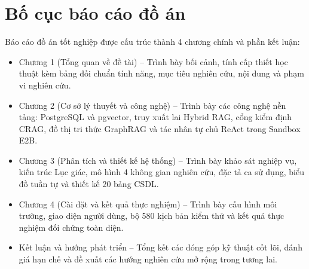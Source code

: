 \section{Bố cục báo cáo đồ án}
\label{sec:bo_cuc}
Báo cáo đồ án tốt nghiệp được cấu trúc thành 4 chương chính và phần kết luận:
\begin{itemize}
    \item Chương 1 (Tổng quan về đề tài) -- Trình bày bối cảnh, tính cấp thiết học thuật kèm bảng đối chuẩn tính năng, mục tiêu nghiên cứu, nội dung và phạm vi nghiên cứu.
    \item Chương 2 (Cơ sở lý thuyết và công nghệ) -- Trình bày các công nghệ nền tảng: PostgreSQL và pgvector, truy xuất lai Hybrid RAG, cổng kiểm định CRAG, đồ thị tri thức GraphRAG và tác nhân tự chủ ReAct trong Sandbox E2B.
    \item Chương 3 (Phân tích và thiết kế hệ thống) -- Trình bày khảo sát nghiệp vụ, kiến trúc Lục giác, mô hình 4 không gian nghiên cứu, đặc tả ca sử dụng, biểu đồ tuần tự và thiết kế 20 bảng CSDL.
    \item Chương 4 (Cài đặt và kết quả thực nghiệm) -- Trình bày cấu hình môi trường, giao diện người dùng, bộ 580 kịch bản kiểm thử và kết quả thực nghiệm đối chứng toàn diện.
    \item Kết luận và hướng phát triển -- Tổng kết các đóng góp kỹ thuật cốt lõi, đánh giá hạn chế và đề xuất các hướng nghiên cứu mở rộng trong tương lai.
\end{itemize}
